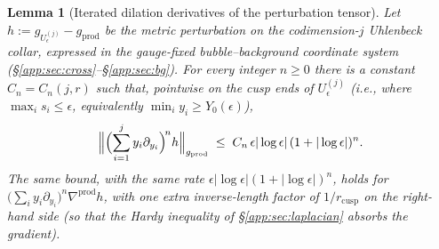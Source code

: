 \documentclass[11pt,letterpaper]{article}
\newtheorem{lemma}[theorem]{Lemma}
\theoremstyle{definition}
\begin{document}
\begin{lemma}[Iterated dilation derivatives of the perturbation tensor]\label{app:lem:iterated-h}
Let $h := g_{U_\epsilon^{(j)}} - g_{\mathrm{prod}}$ be the metric perturbation on the codimension-$j$ Uhlenbeck collar, expressed in the gauge-fixed bubble--background coordinate system (\S\ref{app:sec:cross}--\S\ref{app:sec:bg}). For every integer $n\ge 0$ there is a constant $C_n = C_n(j, r)$ such that, pointwise on the cusp ends of $U_\epsilon^{(j)}$ (i.e., where $\max_i s_i \le \epsilon$, equivalently $\min_i y_i \ge Y_0(\epsilon)$),
\begin{equation}\label{eq:iterated-h-bound}
\Bigl\|\Bigl(\sum_{i=1}^j y_i\partial_{y_i}\Bigr)^{\!n} h\Bigr\|_{g_{\mathrm{prod}}} \;\le\; C_n\,\epsilon|\log\epsilon|\,(1+|\log\epsilon|)^n.
\end{equation}
The same bound, with the same rate $\epsilon|\log\epsilon|(1+|\log\epsilon|)^n$, holds for $\bigl(\sum_i y_i\partial_{y_i}\bigr)^n \nabla^{\mathrm{prod}} h$, with one extra inverse-length factor of $1/r_{\mathrm{cusp}}$ on the right-hand side (so that the Hardy inequality of \S\ref{app:sec:laplacian} absorbs the gradient).
\end{lemma}
\end{document}
